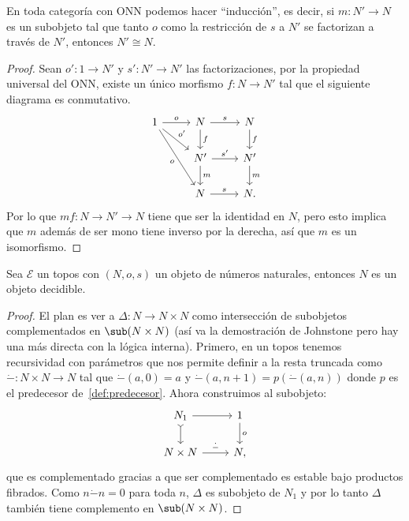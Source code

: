 \begin{proposition}
  En toda categoría con ONN podemos hacer ``inducción'', es decir, si $m\colon N'\to N$ es un subobjeto
  tal que tanto $o$ como la restricción de $s$ a $N'$ se factorizan a través de $N'$, entonces $N'\cong N$.
\end{proposition}
\begin{proof}
  Sean $o'\colon 1\to N'$ y $s'\colon N'\to N'$ las factorizaciones, por la propiedad universal del ONN, existe un único 
  morfismo $f\colon N\to N'$ tal que el siguiente diagrama es conmutativo.
  \begin{equation*}
    \begin{tikzcd}
      1\ar{r}{o}\ar{rd}{o'}\ar[swap]{rdd}{o} & N\ar{d}{f}\ar{r}{s} & N\ar{d}{f} \\
      & N'\ar{r}{s'}\ar{d}{m} & N'\ar{d}{m} \\
      & N\ar{r}{s} & N.
    \end{tikzcd}
  \end{equation*}
  Por lo que $mf\colon N\to N'\to N$ tiene que ser la identidad en $N$, pero esto implica que $m$ además de ser mono tiene
  inverso por la derecha, así que $m$ es un isomorfismo.
\end{proof}

\begin{theorem}[label=thm:onndecidible]
  Sea $\mathcal{E}$ un topos con $(N,o,s)$ un objeto de números naturales, entonces $N$ es un objeto decidible.
\end{theorem}
\begin{proof}
  El plan es ver a $\Delta\colon N\to N\times N$ como intersección de subobjetos complementados en $\sub(N\times N)$ (así va la demostración de Johnstone pero hay una más directa con la lógica interna).
  Primero, en un topos tenemos recursividad con parámetros que nos permite definir a la resta truncada como 
  $\dot{-}\colon N\times N\to N$ tal que $\dot{-}(a,0)=a$ y $\dot{-}(a,n+1)=p(\dot{-}(a,n))$ donde $p$ es el predecesor de~\ref{def:predecesor}.
  Ahora construimos al subobjeto:
  \begin{equation*}
    \begin{tikzcd}
      N_1\ar{r}{}\ar[tail]{d}{} & 1\ar{d}{o} \\
      N\times N\ar{r}{\dot{-}} & N,
    \end{tikzcd}
  \end{equation*}
  que es complementado gracias a que ser complementado es estable bajo productos fibrados. Como $n\dot{-}n=0$ para toda $n$,
  $\Delta$ es subobjeto de $N_1$ y por lo tanto $\Delta$ también tiene complemento en $\sub(N\times N)$.
\end{proof}

